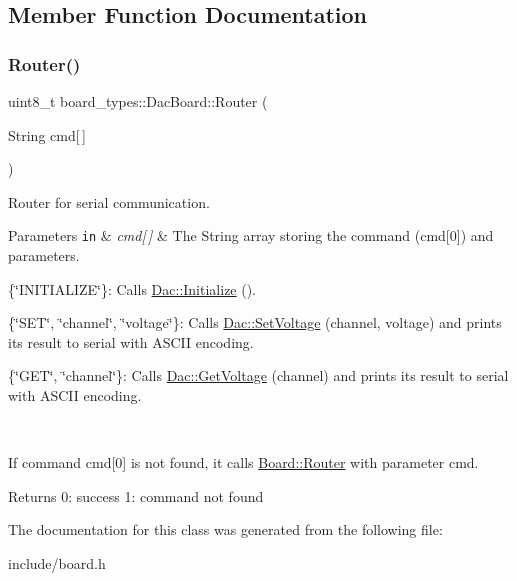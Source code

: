 \subsection{Member Function Documentation}
\mbox{\label{classboard__types_1_1DacBoard_aead21571ec1138db3836de77850439f9}} 
\subsubsection{\texorpdfstring{Router()}{Router()}}
{\footnotesize\ttfamily uint8\+\_\+t board\+\_\+types\+::\+Dac\+Board\+::\+Router (\begin{DoxyParamCaption}\item[{String}]{cmd\mbox{[}$\,$\mbox{]} }\end{DoxyParamCaption})\hspace{0.3cm}{\ttfamily [inline]}}

Router for serial communication. 
\begin{DoxyParams}[1]{Parameters}
\mbox{\tt in}  & {\em cmd\mbox{[}$\,$\mbox{]}} & The String array storing the command (cmd\mbox{[}0\mbox{]}) and parameters.
\begin{DoxyItemize}
\item \{\char`\"{}\+I\+N\+I\+T\+I\+A\+L\+I\+Z\+E\char`\"{}\}\+: Calls \mbox{\hyperlink{classDac_aea1f5f36c9371ebc1527e848ce67e47a}{Dac\+::\+Initialize}} ().
\item \{\char`\"{}\+S\+E\+T\char`\"{}, \char`\"{}channel\char`\"{}, \char`\"{}voltage\char`\"{}\}\+: Calls \mbox{\hyperlink{classDac_ab2f0e36184b9b529de04136c36a3a51b}{Dac\+::\+Set\+Voltage}} (channel, voltage) and prints its result to serial with A\+S\+C\+II encoding.
\item \{\char`\"{}\+G\+E\+T\char`\"{}, \char`\"{}channel\char`\"{}\}\+: Calls \mbox{\hyperlink{classDac_ad51bf5450f03f39a0357398af69f1705}{Dac\+::\+Get\+Voltage}} (channel) and prints its result to serial with A\+S\+C\+II encoding.
\end{DoxyItemize}\\
\hline
\end{DoxyParams}
If command cmd\mbox{[}0\mbox{]} is not found, it calls \mbox{\hyperlink{classboard__types_1_1Board_acd50f8de221d5b3fd978484efbf5198e}{Board\+::\+Router}} with parameter cmd. \begin{DoxyReturn}{Returns}
0\+: success 1\+: command not found 
\end{DoxyReturn}


The documentation for this class was generated from the following file\+:\begin{DoxyCompactItemize}
\item 
include/board.\+h\end{DoxyCompactItemize}
